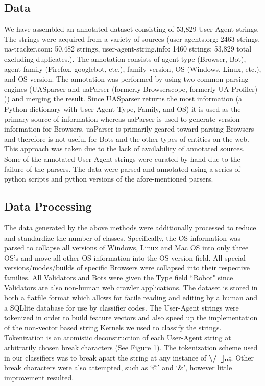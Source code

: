 \documentclass[10pt]{article}
\begin{document}
\begin{multicols}{2}
\subsection{Data}
We have assembled an annotated dataset consisting of 53,829 User-Agent strings.  The strings were acquired from a variety of sources (user-agents.org: 2463 strings, ua-tracker.com: 50,482 strings, user-agent-string.info: 1460 strings; 53,829 total excluding duplicates.).\cite{ua.org,uatracker,uas.info}  The annotation consists of agent type (Browser, Bot), agent family (Firefox, googlebot, etc.), family version, OS (Windows, Linux, etc.), and OS version.  The annotation was performed by using two common parsing engines (UASparser\cite{uas.info} and uaParser (formerly Browserscope, formerly UA Profiler)\cite{uaParser} )) and merging the result.  Since UASparser returns the most information (a Python dictionary with User-Agent Type, Family, and OS) it is used as the primary source of information whereas uaParser is used to generate version information for Browsers.  uaParser is primarily geared toward parsing Browsers and therefore is not useful for Bots and the other types of entities on the web.   This approach was taken due to the lack of availability of annotated sources.  Some of the annotated User-Agent strings were curated by hand due to the failure of the parsers.  The data were parsed and annotated using a series of python scripts and python versions of the afore-mentioned parsers.  
\subsection{Data Processing}
The data generated by the above methods were additionally processed to reduce and standardize the number of classes.  Specifically, the OS information was parsed to collapse all versions of Windows, Linux and Mac OS into only three OS's and move all other OS information into the OS version field.  All special versions/modes/builds of specific Browsers were collapsed into their respective families.  All Validators and Bots were given the Type field ``Robot" since Validators are also non-human web crawler applications.  The dataset is stored in both a flatfile format which allows for facile reading and editing by a human and a SQLlite database for use by classifier codes.  
The User-Agent strings were tokenized in order to build feature vectors and also speed up the implementation of the non-vector based string Kernels we used to classify the strings.  Tokenization is an atomistic deconstruction of each User-Agent string at arbitrarily chosen break characters (See Figure 1).  The tokenization scheme used in our classifiers was to break apart the string at any instance of {\bf \textbackslash / [].,;}.  Other break characters were also attempted, such as `@' and `\&', however little improvement resulted.  


\end{multicols}
\end{document}
